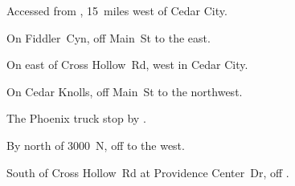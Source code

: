 
\begin{LocationList}

Accessed from , 15~miles west of Cedar City.

On Fiddler~Cyn, off  Main~St to the east.

On  east of Cross Hollow~Rd, west in Cedar City.

On Cedar Knolls, off  Main~St to the northwest.

The Phoenix truck stop by  .

By  north of 3000~N, off   to the west.

South of Cross Hollow~Rd at Providence Center~Dr, off  .

\end{LocationList}
